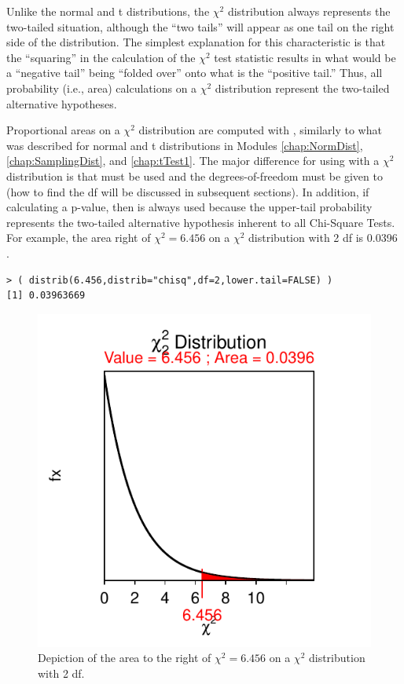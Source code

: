 \documentclass[10pt,openany]{book}\usepackage[]{graphicx}\usepackage[]{color}
\makeatletter
\newenvironment{kframe}{%
 \def\at@end@of@kframe{}%
 \ifinner\ifhmode%
  \def\at@end@of@kframe{\end{minipage}}%
  \begin{minipage}{\columnwidth}%
 \fi\fi%
 \def\FrameCommand##1{\hskip\@totalleftmargin \hskip-\fboxsep
 \colorbox{shadecolor}{##1}\hskip-\fboxsep
     \hskip-\linewidth \hskip-\@totalleftmargin \hskip\columnwidth}%
 \MakeFramed {\advance\hsize-\width
   \@totalleftmargin\z@ \linewidth\hsize
   \@setminipage}}%
 {\par\unskip\endMakeFramed%
 \at@end@of@kframe}
\newenvironment{knitrout}{}{} %
\makeatother
\begin{document}
Unlike the normal and t distributions, the $\chi^2$ distribution always represents the two-tailed situation, although the ``two tails'' will appear as one tail on the right side of the distribution. The simplest explanation for this characteristic is that the ``squaring'' in the calculation of the $\chi^{2}$ test statistic results in what would be a ``negative tail'' being ``folded over'' onto what is the ``positive tail.''  Thus, all probability (i.e., area) calculations on a $\chi^{2}$ distribution represent the two-tailed alternative hypotheses.

Proportional areas on a $\chi^2$ distribution are computed with ,  similarly to what was described for normal and t distributions in Modules \ref{chap:NormDist}, \ref{chap:SamplingDist}, and \ref{chap:tTest1}. The major difference for using  with a $\chi^2$ distribution is that  must be used and the degrees-of-freedom must be given to  (how to find the df will be discussed in subsequent sections). In addition, if calculating a p-value, then  is always used because the upper-tail probability represents the two-tailed alternative hypothesis inherent to all Chi-Square Tests. For example, the area right of $\chi^2=6.456$ on a $\chi^2$ distribution with 2 df is 0.0396 .
\vspace{-3pt}
\begin{knitrout}
\color{fgcolor}\begin{kframe}
\begin{verbatim}
> ( distrib(6.456,distrib="chisq",df=2,lower.tail=FALSE) )
[1] 0.03963669
\end{verbatim}
\end{kframe}\begin{figure}[hbtp]

{\centering \includegraphics[width=.4\linewidth]{Figs/chiarea1-1} 

}

\caption[Depiction of the area to the right of $\chi^2=6.456$ on a $\chi^2$ distribution with 2 df]{Depiction of the area to the right of $\chi^2=6.456$ on a $\chi^2$ distribution with 2 df.}\label{fig:chiarea1}
\end{figure}


\end{knitrout}
\end{document}
